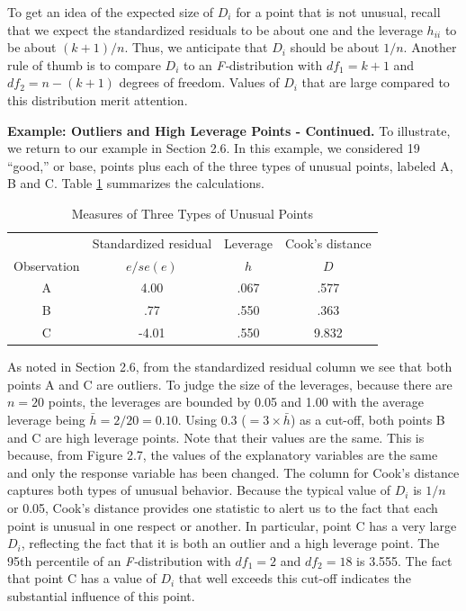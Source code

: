 To get an idea of the expected size of $D_i$ for a point that is not
unusual, recall that we expect the standardized residuals to be
about one and the leverage $h_{ii}$ to be about $(k+1)/n$. Thus, we
anticipate that $D_i$ should be about $1/n$. Another rule of thumb
is to compare $D_i$ to an \textit{F-}distribution with $df_1=k+1$
and $df_2=n-(k+1)$ degrees of freedom. Values of $D_i$ that are
large compared to this distribution merit attention.

\linejed{}

\textbf{Example: Outliers and High Leverage Points - Continued.} To
illustrate, we return to our example in Section 2.6. In this
example, we considered 19 ``good,'' or base, points plus each of the
three types of unusual points, labeled A, B and C. Table
\ref{T5:Outliers} summarizes the calculations.

\begin{table}[h]

\caption{\label{T5:Outliers} Measures of Three Types of Unusual
Points}
\begin{tabular}{cccc}
\hline
& Standardized residual & Leverage & Cook's distance \\
Observation & $e/se(e)$ & $h$ & $D$ \\ \hline
A & 4.00 & .067 & .577 \\
 B & .77 & .550 & .363 \\
C & -4.01 & .550 & 9.832 \\ \hline
\end{tabular}
\end{table}

As noted in Section 2.6, from the standardized residual column we
see that both points A and C are outliers. To judge the size of the
leverages, because there are $n=20$ points, the leverages are
bounded by 0.05 and 1.00 with the average leverage being
$\bar{h}=2/20=0.10$. Using 0.3 ($ = 3 \times  \bar{h}$) as a
cut-off, both points B and C are high leverage points. Note that
their values are the same. This is because, from Figure 2.7, the
values of the explanatory variables are the same and only the
response variable has been changed. The column for Cook's distance
captures both types of unusual behavior. Because the typical value
of $D_i$ is $1/n$ or 0.05, Cook's distance provides one statistic to
alert us to the fact that each point is unusual in one respect or
another. In particular, point C has a very large $D_i$, reflecting
the fact that it is both an outlier and a high leverage point. The
95th percentile of an \textit{F-}distribution with $df_1=2$ and
$df_2=18$ is 3.555. The fact that point C has a value of $D_i$ that
well exceeds this cut-off indicates the substantial influence of
this point.

